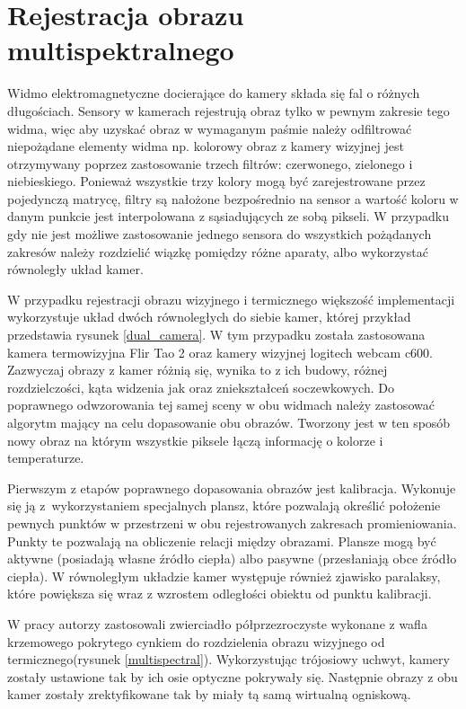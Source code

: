 \section{Rejestracja obrazu multispektralnego}

Widmo elektromagnetyczne docierające do kamery składa się fal o różnych długościach. Sensory w kamerach rejestrują obraz tylko w pewnym zakresie tego widma, więc aby uzyskać obraz w wymaganym paśmie należy odfiltrować niepożądane elementy widma np. kolorowy obraz z kamery wizyjnej jest otrzymywany poprzez zastosowanie trzech filtrów: czerwonego, zielonego i niebieskiego. Ponieważ wszystkie trzy kolory mogą być zarejestrowane przez pojedynczą matrycę, filtry są nałożone bezpośrednio na sensor a wartość koloru w danym punkcie jest interpolowana z sąsiadujących ze sobą pikseli. W przypadku gdy nie jest możliwe zastosowanie jednego sensora do wszystkich pożądanych zakresów należy rozdzielić wiązkę pomiędzy różne aparaty, albo wykorzystać równoległy układ kamer. 

W przypadku rejestracji obrazu wizyjnego i termicznego większość implementacji wykorzystuje układ dwóch równoległych do siebie kamer, której przykład przedstawia rysunek \ref{dual_camera}. W tym przypadku została zastosowana kamera termowizyjna Flir Tao 2 oraz kamery wizyjnej logitech webcam c600. %
Zazwyczaj obrazy z kamer różnią się, wynika to z ich budowy, różnej rozdzielczości, kąta widzenia jak oraz zniekształceń soczewkowych.
Do poprawnego odwzorowania tej samej sceny w obu widmach należy zastosować algorytm mający na celu dopasowanie obu obrazów. Tworzony jest w ten sposób nowy obraz na którym wszystkie piksele łączą informację o kolorze i temperaturze.

Pierwszym z etapów poprawnego dopasowania obrazów jest kalibracja.
Wykonuje się ją z~wykorzystaniem specjalnych plansz, które pozwalają określić położenie pewnych punktów w przestrzeni w obu rejestrowanych zakresach promieniowania. 
Punkty te pozwalają na obliczenie relacji między obrazami. 
Plansze mogą być aktywne (posiadają własne źródło ciepła) albo pasywne (przesłaniają obce źródło ciepła). 
W równoległym układzie kamer występuje również zjawisko paralaksy, które powiększa się wraz z wzrostem odległości obiektu od punktu kalibracji. 

W pracy \cite{hwang2015multispectral} autorzy zastosowali zwierciadło półprzezroczyste wykonane z wafla krzemowego pokrytego cynkiem do rozdzielenia obrazu wizyjnego od termicznego(rysunek \ref{multispectral}). Wykorzystując trójosiowy uchwyt, kamery zostały ustawione tak by ich osie optyczne pokrywały się. Następnie obrazy z obu kamer zostały zrektyfikowane tak by miały tą samą wirtualną ogniskową.

